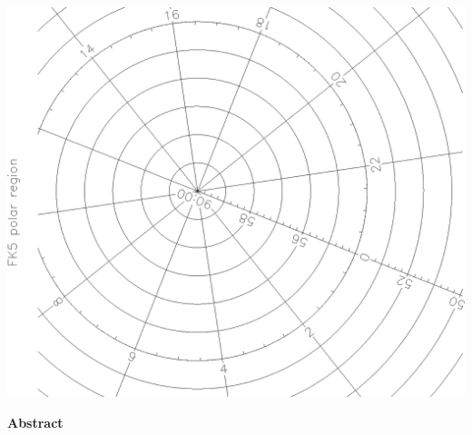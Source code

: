 \documentclass[twoside,11pt]{article}
\newenvironment{latexonly}{}{}
\begin{document}
\begin{latexonly}
\begin{center}
   \includegraphics[scale=0.25,angle=-90]{sun210_figures/frontc_bw.eps}\hfill
   \mbox{}
   \end{center}

   \begin{center}
      {\Large\bf Abstract}
   \end{center}
\end{latexonly}
\end{document}
